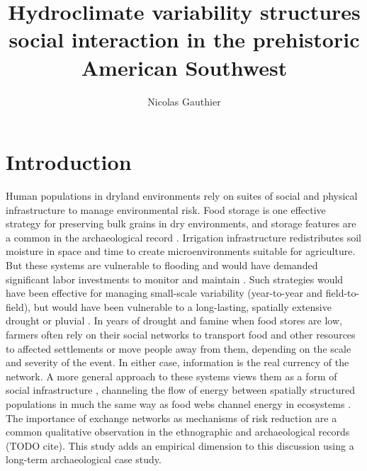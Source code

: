 \documentclass[fleqn,10pt]{wlscirep}
\title{Hydroclimate variability structures social interaction in the prehistoric American Southwest}
\author[1,*]{Nicolas Gauthier}
\affil[1]{School of Human Evolution and Social Change, 900 S Caddy Mall, Tempe, USA}
\affil[*]{Nicolas.Gauthier@asu.edu}
\begin{document}
\flushbottom
\maketitle


\thispagestyle{empty}


\section*{Introduction}
Human populations in dryland environments rely on suites of social and physical infrastructure to manage environmental risk. Food storage is one effective strategy for preserving bulk grains in dry environments, and storage features are a common in the archaeological record \cite{Spielmann2011SustainableEnvironments}. Irrigation infrastructure redistributes soil moisture in space and time to create microenvironments suitable for agriculture. But these systems are vulnerable to flooding and would have demanded significant labor investments to monitor and maintain \cite{Dominguez2005}. Such strategies would have been effective for managing small-scale variability (year-to-year and field-to-field), but would have been vulnerable to a long-lasting, spatially extensive drought or pluvial \cite{Halstead1989}. In years of drought and famine when food stores are low, farmers often rely on their social networks to transport food and other resources to affected settlements or move people away from them, depending on the scale and severity of the event. In either case, information is the real currency of the network. A more general approach to these systems views them as a form of social infrastructure \cite{STRAWHACKER2015}, channeling the flow of energy between spatially structured populations in much the same way as food webs channel energy in ecosystems \cite{Crabtree2015,Crabtree2017ReconstructingStates}. The importance of exchange networks as mechanisms of risk reduction are a common qualitative observation in the ethnographic and archaeological records (TODO cite). This study adds an empirical dimension to this discussion using a long-term archaeological case study.%
\end{document}
